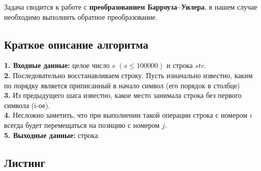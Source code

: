 \documentclass[a5paper, 10pt]{article}
\theoremstyle{definition}
\theoremstyle{plain}
\theoremstyle{remark}
\begin{document}
Задача сводится к работе с \textbf{преобразованием Барроуза--Уилера}, в нашем случае необходимо выполнить обратное преобразование.

\subsection{Краткое описание алгоритма}
\textbf{1. Входные данные:} целое число $s \, \, (s \leq 100000) $ и строка $str$. \\
\textbf{2.} Последовательно восстанавливаем строку. Пусть изначально известно, каким по порядку является приписанный в начало символ (его порядок в столбце)\\
\textbf{3.} Из предыдущего шага известно, какое место занимала строка без первого символа (i-ое).\\
\textbf{4.} Несложно заметить, что при выполнении такой операции строка с номером $i$ всегда будет перемещаться на позицию с номером $j$.\\
\textbf{5. Выходные данные:} строка.

\subsection{Листинг}
\end{document}
